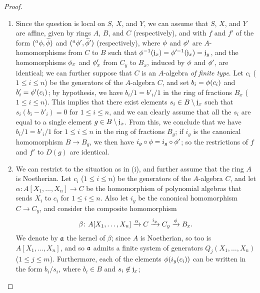 \begin{proof}
\label{proof-1.6.5.1}
\begin{enumerate}[label=\rm(\roman*)]
    \item Since the question is local on $S$, $X$, and $Y$, we can assume that $S$, $X$, and $Y$ are affine, given by rings $A$, $B$, and $C$ (respectively), and with $f$ and $f'$ of the form $({}^a\phi,\widetilde{\phi})$ and $({}^a\phi',\widetilde{\phi}')$ (respectively), where $\phi$ and $\phi'$ are $A$-homomorphisms from $C$ to $B$ such that $\phi^{-1}(\mathfrak{j}_x)=\phi'^{-1}(\mathfrak{j}_x)=\mathfrak{j}_y$, and the homomorphisms $\phi_x$ and $\phi'_x$ from $C_y$ to $B_x$, induced by $\phi$ and $\phi'$, are identical;
        we can further suppose that $C$ is an $A$-algebra \emph{of finite type}.
        Let $c_i$ ($1\leqslant i\leqslant n$) be the generators of the $A$-algebra $C$, and set $b_i=\phi(c_i)$ and $b'_i=\phi'(c_i)$;
        by hypothesis, we have $b_i/1=b'_i/1$ in the ring of fractions $B_x$ ($1\leqslant i\leqslant n$).
        This implies that there exist elements $s_i\in B\setminus\mathfrak{j}_x$ such that $s_i(b_i-b'_i)=0$ for $1\leqslant i\leqslant n$, and we can clearly assume that all the $s_i$ are equal to a single element $g\in B\setminus\mathfrak{j}_x$.
        From this, we conclude that we have $b_i/1=b'_i/1$ for $1\leqslant i\leqslant n$ in the ring of fractions $B_g$;
        if $i_g$ is the canonical homomorphism $B\to B_g$, we then have $i_g\circ\phi=i_g\circ\phi'$;
        so the restrictions of $f$ and $f'$ to $D(g)$ are identical.
    \item We can restrict to the situation as in (i), and further assume that the ring $A$ is Noetherian.
        Let $c_i$ ($1\leqslant i\leqslant n$) be the generators of the $A$-algebra $C$, and let $\alpha\colon A[X_1,\ldots,X_n]\to C$ be the homomorphism of polynomial algebras that sends $X_i$ to $c_i$ for $1\leqslant i\leqslant n$.
        Also let $i_y$ be the canonical homomorphism $C\to C_y$, and consider the composite homomorphism
        \begin{equation*}
            \beta\colon A[X_1,\ldots,X_n] \xrightarrow{\alpha} C \xrightarrow{i_y} C_y \xrightarrow{\phi} B_x.
        \end{equation*}
        We denote by $\mathfrak{a}$ the kernel of $\beta$;
        since $A$ is Noetherian, so too is $A[X_1,\ldots,X_n]$, and so $\mathfrak{a}$ admits a finite system of generators $Q_j(X_1,\ldots,X_n)$ ($1\leqslant j\leqslant m$).
        Furthermore, each of the elements $\phi(i_y(c_i))$ can be written in the form $b_i/s_i$, where $b_i\in B$ and $s_i\not\in\mathfrak{j}_x$;

\end{enumerate}
\end{proof}
